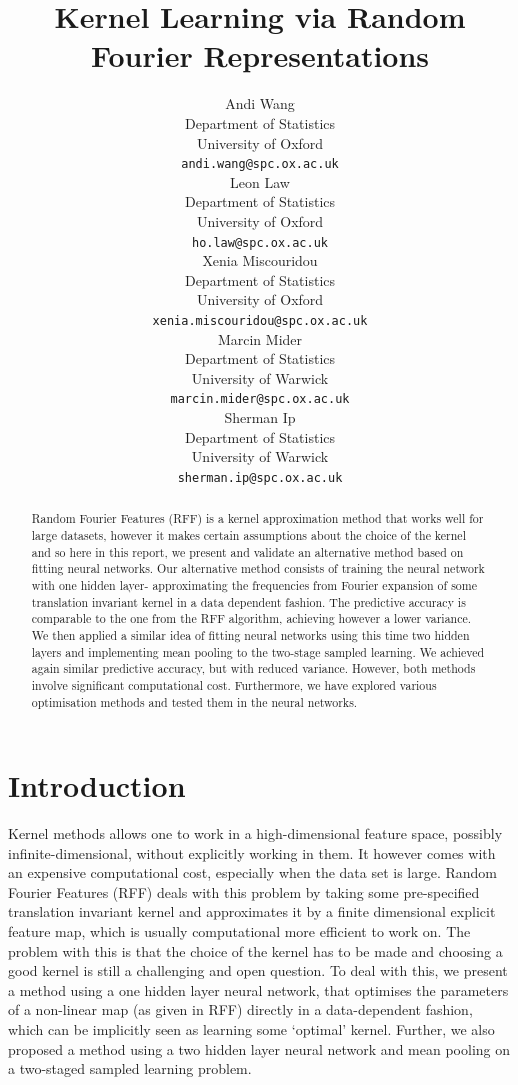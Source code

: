 \documentclass{article} %
\title{Kernel Learning via Random Fourier Representations}
\author{
Andi Wang\\
Department of Statistics\\
University of Oxford\\
\texttt{andi.wang@spc.ox.ac.uk} \\
\And
Leon Law \\
Department of Statistics \\
University of Oxford \\
\texttt{ho.law@spc.ox.ac.uk} \\
\AND
Xenia Miscouridou \\
Department of Statistics \\
University of Oxford \\
\texttt{xenia.miscouridou@spc.ox.ac.uk} \\
\And
Marcin Mider \\
Department of Statistics \\
University of Warwick\\
\texttt{marcin.mider@spc.ox.ac.uk} \\
\And
Sherman Ip \\
Department of Statistics \\
University of Warwick \\
\texttt{sherman.ip@spc.ox.ac.uk} \\
}
\begin{document}
\maketitle

\begin{abstract}
Random Fourier Features (RFF) is a kernel approximation method that works well for large datasets, however it makes certain assumptions about the choice of the kernel and so here in this report, we present and validate an alternative method based on fitting neural networks. Our alternative method consists of training the neural network with one hidden layer- approximating the frequencies from Fourier expansion of some translation invariant kernel in a data dependent fashion. The predictive accuracy is comparable to the one from the RFF algorithm, achieving however a lower variance. We then applied a similar idea of fitting neural networks using this time two hidden layers and implementing mean pooling to the two-stage sampled learning. We achieved again similar predictive accuracy, but with reduced variance. However,  both methods involve significant computational cost. Furthermore, we have explored various optimisation methods and tested them in the neural networks.
\end{abstract}



\section{Introduction}
Kernel methods allows one to work in a high-dimensional feature space, possibly infinite-dimensional, without explicitly working in them. It however comes with an expensive computational cost, especially when the data set is large. Random Fourier Features (RFF) \cite{Rahimi} deals with this problem by taking some pre-specified translation invariant kernel and approximates it by a finite dimensional explicit feature map, which is usually computational more efficient to work on. The problem with this is that the choice of the kernel has to be made and choosing a good kernel is still a challenging and open question. To deal with this, we present a method using a one hidden layer neural network, that optimises the parameters of a non-linear map (as given in RFF) directly in a data-dependent fashion, which can be implicitly seen as learning some `optimal' kernel. Further, we also proposed a method using a two hidden layer neural network and mean pooling on a two-staged sampled learning problem.
\\
\end{document}
